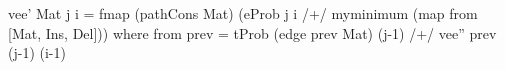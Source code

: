 vee' Mat j i = fmap (pathCons Mat)
  (eProb j i /+/ myminimum (map from [Mat, Ins, Del]))
 where from prev = tProb (edge prev Mat) (j-1) /+/
                               vee'' prev (j-1) (i-1)
